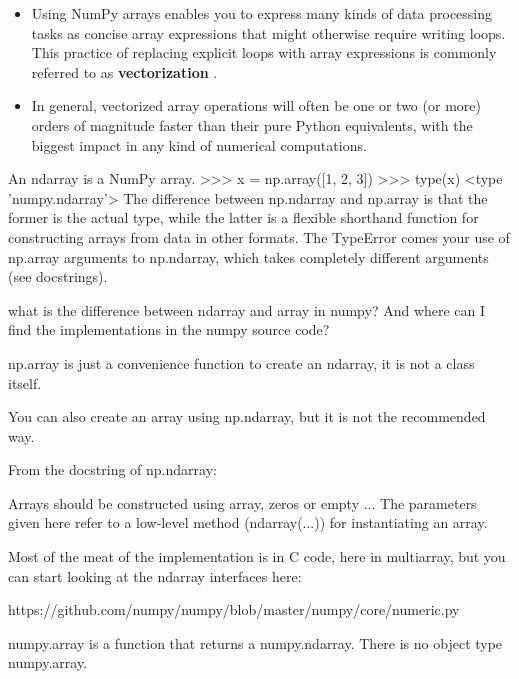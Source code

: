 \documentclass[11pt]{article} %
\begin{document}
\begin{itemize}
\item Using NumPy arrays enables you to express many kinds of data processing tasks as
concise array expressions that might otherwise require writing loops. This practice of
replacing explicit loops with array expressions is commonly referred to as \textbf{vectorization
}.

\item In general, vectorized array operations will often be one or two (or more) orders
of magnitude faster than their pure Python equivalents, with the biggest impact in any
kind of numerical computations.
\end{itemize}
\newpage
An ndarray is a NumPy array.
>>> x = np.array([1, 2, 3])
>>> type(x)
<type 'numpy.ndarray'>
The difference between np.ndarray and np.array is that the former is the actual type, while the latter is a flexible shorthand function for constructing arrays from data in other formats. The TypeError comes your use of np.array arguments to np.ndarray, which takes completely different arguments (see docstrings).

what is the difference between ndarray and array in numpy? And where can I find the implementations in the numpy source code?

 np.array is just a convenience function to create an ndarray, it is not a class itself. 

You can also create an array using np.ndarray, but it is not the recommended way. 

From the docstring of np.ndarray: 


Arrays should be constructed using array, zeros or empty ... 
The parameters given here refer to a low-level method (ndarray(...)) for instantiating an array.
 
Most of the meat of the implementation is in C code, here in multiarray, but you can start looking at the ndarray interfaces here:

https://github.com/numpy/numpy/blob/master/numpy/core/numeric.py
 


numpy.array is a function that returns a numpy.ndarray. There is no object type numpy.array.
 
\end{document}
